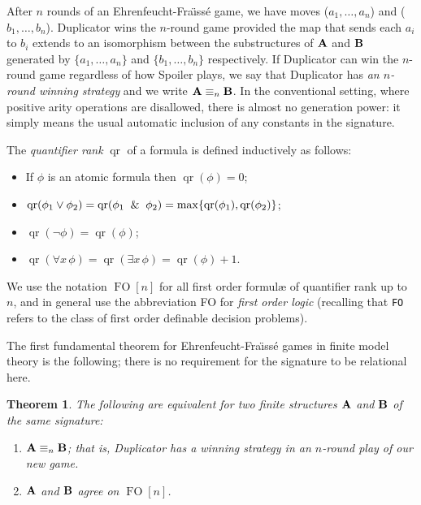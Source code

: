 \documentclass[reqno]{amsart}
\theoremstyle{plain}
\newtheorem{thm}{Theorem}[section]
\theoremstyle{definition}
\newcommand{\qr}{\operatorname{qr}}
\newcommand{\up}[1]{\textup{#1}}
\newcommand{\FO}{\operatorname{FO}}
\begin{document}
After $n$ rounds of an Ehrenfeucht-Fra\"{\i}ss\'e game, we have moves ($a_1,\dots,a_n$) and ($b_1,\dots,b_n$). 
Duplicator wins the $n$-round game  provided the map that sends each $a_i$ to $b_i$ extends to an isomorphism between the substructures of ${\bf A}$ and ${\bf B}$ generated by $\{a_1,\dots,a_n\}$ and $\{b_1,\dots,b_n\}$ respectively.  If Duplicator can win the $n$-round game regardless of how Spoiler plays, we say that Duplicator has \emph{an $n$-round winning strategy} and we write ${\bf A}\equiv_n{\bf B}$.  In the conventional setting, where positive arity operations are disallowed, there is almost no generation power: it simply means the usual automatic inclusion of any constants in the signature.  

The \emph{quantifier rank} $\qr$ of a formula is defined inductively as follows:
\begin{itemize}
\item If $\phi$ is an atomic formula then $\qr(\phi)=0$;
\item $\qr(\phi_1\vee\phi_2)=\qr(\phi_1\And\phi_2)=\max\{\qr(\phi_1),\qr(\phi_2)\}$;
\item $\qr(\neg\phi)=\qr(\phi)$;
\item $\qr(\forall x\,  \phi)=\qr(\exists x\, \phi)=\qr(\phi)+1$.\\
\end{itemize}
We use the notation $\FO[n]$ for all first order formul{\ae} of quantifier rank up to $n$, and in general use the abbreviation FO for \emph{first order logic}
(recalling that \texttt{FO} refers to the class of first order definable decision problems).

The first fundamental theorem for Ehrenfeucht-Fra\"{\i}ss\'e games in finite model theory is the following; there is no requirement for the signature to be relational here.
\begin{thm}\label{thm:algEF}
The following are equivalent for two finite structures ${\bf A}$ and ${\bf B}$ of the same signature\up:
\begin{enumerate}
\item ${\bf A}\equiv_n{\bf B}$\up; that is, Duplicator has a winning strategy in an $n$-round play of our new game.
\item ${\bf A}$ and ${\bf B}$ agree on $\FO[n]$.
\end{enumerate}
\end{thm}
\end{document}
